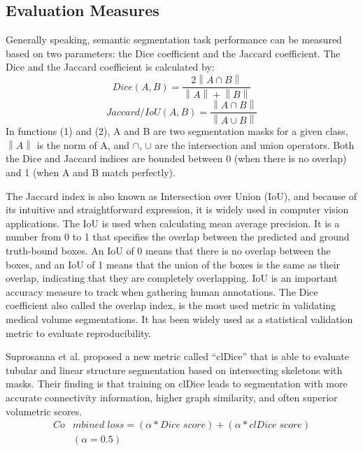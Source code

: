 \documentclass{article}
\begin{document}
\subsection{Evaluation Measures}
Generally speaking, semantic segmentation task performance can be measured based on two parameters: the Dice coefficient and the Jaccard coefficient. The Dice and the Jaccard coefficient is calculated by:
\begin{equation}
    Dice(A,B) = \frac{2\left \| A \cap B \right \|}{\left \| A \right \|+\left \| B \right \|}
\end{equation}
\begin{equation}
    Jaccard/IoU(A,B) = \frac{\left \| A \cap B \right \|}{\left \| A\cup B \right \|}
\end{equation}
In functions (1) and (2), A and B are two segmentation masks for a given class, $\left \| A \right \|$ is the norm of A, and $\cap$, $\cup$ are the intersection and union operators. Both the Dice and Jaccard indices are bounded between 0 (when there is no overlap) and 1 (when A and B match perfectly).

The Jaccard index is also known as Intersection over Union (IoU), and because of its intuitive and straightforward expression, it is widely used in computer vision applications. The IoU is used when calculating mean average precision. It is a number from 0 to 1 that specifies the overlap between the predicted and ground truth-bound boxes. An IoU of 0 means that there is no overlap between the boxes, and an IoU of 1 means that the union of the boxes is the same as their overlap, indicating that they are completely overlapping. IoU is an important accuracy measure to track when gathering human annotations. The Dice coefficient also called the overlap index, is the most used metric in validating medical volume segmentations. It has been widely used as a statistical validation metric to evaluate reproducibility.

Suprosanna et al.\cite{shit2020cldice} proposed a new metric called “clDice” that is able to evaluate tubular and linear structure segmentation based on intersecting skeletons with masks. Their finding is that training on clDice leads to segmentation with more accurate connectivity information, higher graph similarity, and often superior volumetric scores.
\begin{equation}
    \begin{aligned}
        Co & mbined\;loss = (\alpha * Dice\;score)+(\alpha * clDice\;score) \\
           & (\alpha=0.5)
    \end{aligned}
\end{equation}
\end{document}
